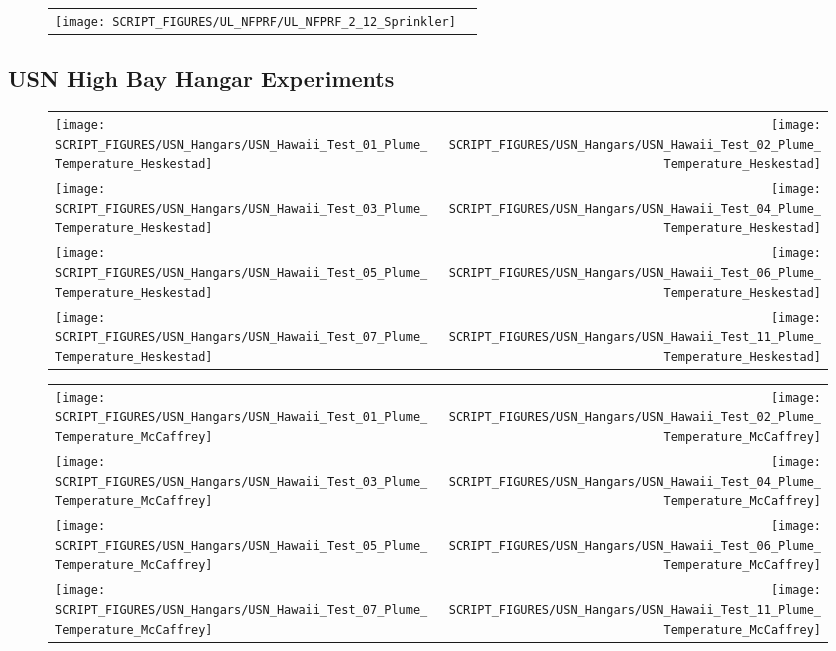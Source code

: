 \begin{figure}[!ht]
\begin{tabular*}{\textwidth}{l@{\extracolsep{\fill}}r}
\texttt{[image: SCRIPT\_FIGURES/UL\_NFPRF/UL\_NFPRF\_2\_12\_Sprinkler]}
\end{tabular*}
\end{figure}

\clearpage

\subsection{USN High Bay Hangar Experiments}

\begin{figure}[!ht]
\begin{tabular*}{\textwidth}{l@{\extracolsep{\fill}}r}
\texttt{[image: SCRIPT\_FIGURES/USN\_Hangars/USN\_Hawaii\_Test\_01\_Plume\_Temperature\_Heskestad]} &
\texttt{[image: SCRIPT\_FIGURES/USN\_Hangars/USN\_Hawaii\_Test\_02\_Plume\_Temperature\_Heskestad]} \\
\texttt{[image: SCRIPT\_FIGURES/USN\_Hangars/USN\_Hawaii\_Test\_03\_Plume\_Temperature\_Heskestad]} &
\texttt{[image: SCRIPT\_FIGURES/USN\_Hangars/USN\_Hawaii\_Test\_04\_Plume\_Temperature\_Heskestad]} \\
\texttt{[image: SCRIPT\_FIGURES/USN\_Hangars/USN\_Hawaii\_Test\_05\_Plume\_Temperature\_Heskestad]} &
\texttt{[image: SCRIPT\_FIGURES/USN\_Hangars/USN\_Hawaii\_Test\_06\_Plume\_Temperature\_Heskestad]} \\
\texttt{[image: SCRIPT\_FIGURES/USN\_Hangars/USN\_Hawaii\_Test\_07\_Plume\_Temperature\_Heskestad]} &
\texttt{[image: SCRIPT\_FIGURES/USN\_Hangars/USN\_Hawaii\_Test\_11\_Plume\_Temperature\_Heskestad]}
\end{tabular*}
\end{figure}

\begin{figure}[!ht]
\begin{tabular*}{\textwidth}{l@{\extracolsep{\fill}}r}
\texttt{[image: SCRIPT\_FIGURES/USN\_Hangars/USN\_Hawaii\_Test\_01\_Plume\_Temperature\_McCaffrey]} &
\texttt{[image: SCRIPT\_FIGURES/USN\_Hangars/USN\_Hawaii\_Test\_02\_Plume\_Temperature\_McCaffrey]} \\
\texttt{[image: SCRIPT\_FIGURES/USN\_Hangars/USN\_Hawaii\_Test\_03\_Plume\_Temperature\_McCaffrey]} &
\texttt{[image: SCRIPT\_FIGURES/USN\_Hangars/USN\_Hawaii\_Test\_04\_Plume\_Temperature\_McCaffrey]} \\
\texttt{[image: SCRIPT\_FIGURES/USN\_Hangars/USN\_Hawaii\_Test\_05\_Plume\_Temperature\_McCaffrey]} &
\texttt{[image: SCRIPT\_FIGURES/USN\_Hangars/USN\_Hawaii\_Test\_06\_Plume\_Temperature\_McCaffrey]} \\
\texttt{[image: SCRIPT\_FIGURES/USN\_Hangars/USN\_Hawaii\_Test\_07\_Plume\_Temperature\_McCaffrey]} &
\texttt{[image: SCRIPT\_FIGURES/USN\_Hangars/USN\_Hawaii\_Test\_11\_Plume\_Temperature\_McCaffrey]}
\end{tabular*}
\end{figure}

